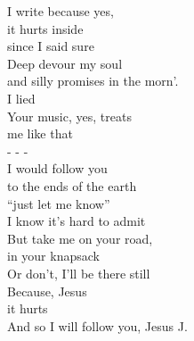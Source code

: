I write because yes,\\
it hurts inside\\
since I said sure\\
Deep devour my soul\\
and silly promises in the morn'.\\
I lied\\
Your music, yes, treats\\
me like that\\
- - -\\
I would follow you\\
to the ends of the earth\\
``just let me know''\\
I know it's hard to admit\\
But take me on your road,\\
in your knapsack\\
Or don't, I'll be there still\\
Because, Jesus\\
it hurts\\
And so I will follow you, Jesus J.\\

